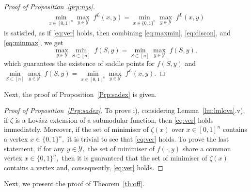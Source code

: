 \documentclass{article}
\theoremstyle{plain}
\theoremstyle{definition}
\theoremstyle{remark}
\begin{document}
\begin{proof}[Proof of Proposition~\ref{prp:ngs}]
\begin{align}
    \underset{x \in [0,1]^n}{\min}\underset{y \in \mathcal{Y}}{\max}\;f^L(x,y)=\underset{x \in \{0,1\}^n}{\min}\underset{y \in \mathcal{Y}}{\max}\;f^L(x,y)
\end{align}
is satisfied, as if \eqref{eq:ver} holds, then combining \eqref{eq:maxmin}, \eqref{eq:discon}, and \eqref{eq:minmax}, we get 
\[\underset{y \in \mathcal{Y}}{\max}\underset{S \subset [n] }{\min}\;f(S,y)=\underset{S \subset [n] }{\min}\underset{y \in \mathcal{Y}}{\max}\;f(S,y),\]
which guarantees the existence of saddle points for $f(S,y)$ and $\underset{S \subset [n] }{\min}\underset{y \in \mathcal{Y}}{\max}\;f(S,y) = \underset{x \in [0,1]^n}{\min}\underset{y \in \mathcal{Y}}{\max}\;f^L(x,y).$ 
\end{proof}


Next, the proof of Proposition~\ref{Prp:sadex} is given.
\begin{proof}[Proof of Proposition~\ref{Prp:sadex}]
    To prove i), considering Lemma~\ref{lm:lmlova}.v), if $\zeta$ is a Lovász extension of a submodular function, then \eqref{eq:ver} holds immediately. Moreover, if the set of minimiser of $\zeta(x)$ over $x\in[0,1]^n$ contains a vertex $x\in\{0,1\}^n,$ it is trivial to see that \eqref{eq:ver} holds.
    To prove the last statement, if for any $y\in\mathcal{Y},$ the set of minimiser of $f(\cdot ,y)$ share a common vertex $x\in\{0,1\}^n,$ then it is guaranteed that the set of minimiser of $\zeta(x)$ contains a vertex and, consequently, \eqref{eq:ver} holds.
\end{proof}
Next, we present the proof of Theorem~\ref{th:off}.
\end{document}
